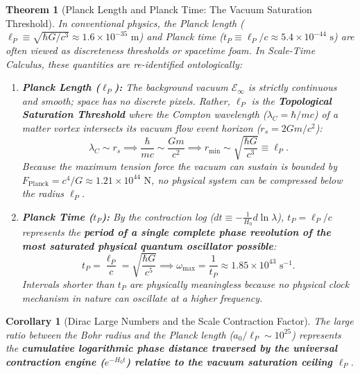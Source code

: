 \documentclass[11pt,a4paper]{article}
\newtheorem{theorem}{Theorem}[section]
\newtheorem{corollary}{Corollary}[theorem]
\begin{document}
\begin{theorem}[Planck Length and Planck Time: The Vacuum Saturation Threshold]
    \label{thm:planck_ontolojisi}
    In conventional physics, the Planck length ($\ell_P \equiv \sqrt{\hbar G/c^3} \approx 1.6 \times 10^{-35}\text{ m}$) and Planck time ($t_P \equiv \ell_P/c \approx 5.4 \times 10^{-44}\text{ s}$) are often viewed as discreteness thresholds or spacetime foam. In Scale-Time Calculus, these quantities are re-identified ontologically:
    \begin{enumerate}
        \item \textbf{Planck Length ($\ell_P$):} The background vacuum $\mathcal{E}_\infty$ is strictly continuous and smooth; space has no discrete pixels. Rather, $\ell_P$ is the \textbf{Topological Saturation Threshold} where the Compton wavelength ($\lambda_C = \hbar/mc$) of a matter vortex intersects its vacuum flow event horizon ($r_s = 2Gm/c^2$):
              \begin{equation}
                  \lambda_C \sim r_s \implies \frac{\hbar}{mc} \sim \frac{Gm}{c^2} \implies r_{\mathrm{min}} \sim \sqrt{\frac{\hbar G}{c^3}} \equiv \ell_P.
                  \label{eq:planck_uzunluk_sc}
              \end{equation}
              Because the maximum tension force the vacuum can sustain is bounded by $F_{\mathrm{Planck}} = c^4/G \approx 1.21 \times 10^{44}\text{ N}$, no physical system can be compressed below the radius $\ell_P$.
        \item \textbf{Planck Time ($t_P$):} By the contraction log ($dt \equiv -\frac{1}{H_0} d\ln\lambda$), $t_P = \ell_P/c$ represents the \textbf{period of a single complete phase revolution of the most saturated physical quantum oscillator possible}:
              \begin{equation}
                  t_P = \frac{\ell_P}{c} = \sqrt{\frac{\hbar G}{c^5}} \implies \omega_{\mathrm{max}} = \frac{1}{t_P} \approx 1.85 \times 10^{43}\text{ s}^{-1}.
                  \label{eq:planck_zaman_sc}
              \end{equation}
              Intervals shorter than $t_P$ are physically meaningless because no physical clock mechanism in nature can oscillate at a higher frequency.
    \end{enumerate}
\end{theorem}

\begin{corollary}[Dirac Large Numbers and the Scale Contraction Factor]
    \label{cor:dirac_buyuk_sayilar_sc}
    The large ratio between the Bohr radius and the Planck length ($a_0 / \ell_P \sim 10^{25}$) represents the \textbf{cumulative logarithmic phase distance traversed by the universal contraction engine ($e^{-H_0 t}$) relative to the vacuum saturation ceiling $\ell_P$}.
\end{corollary}
\end{document}
